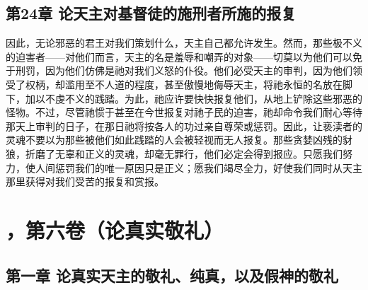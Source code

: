 
\subsection{第24章 论天主对基督徒的施刑者所施的报复}

因此，无论邪恶的君王对我们策划什么，天主自己都允许发生。然而，那些极不义的迫害者——对他们而言，天主的名是羞辱和嘲弄的对象——切莫以为他们可以免于刑罚，因为他们仿佛是祂对我们义怒的仆役。他们必受天主的审判，因为他们领受了权柄，却滥用至不人道的程度，甚至傲慢地侮辱天主，将祂永恒的名放在脚下，加以不虔不义的践踏。为此，祂应许要快快报复他们，从地上铲除这些邪恶的怪物。不过，尽管祂惯于甚至在今世报复对祂子民的迫害，祂却命令我们耐心等待那天上审判的日子，在那日祂将按各人的功过亲自尊荣或惩罚。因此，让亵渎者的灵魂不要以为那些被他们如此践踏的人会被轻视而无人报复。那些贪婪凶残的豺狼，折磨了无辜和正义的灵魂，却毫无罪行，他们必定会得到报应。只愿我们努力，使人间惩罚我们的唯一原因只是正义；愿我们竭尽全力，好使我们同时从天主那里获得对我们受苦的报复和赏报。\par



\section{，第六卷（论真实敬礼）}


\subsection{第一章 论真实天主的敬礼、纯真，以及假神的敬礼}

